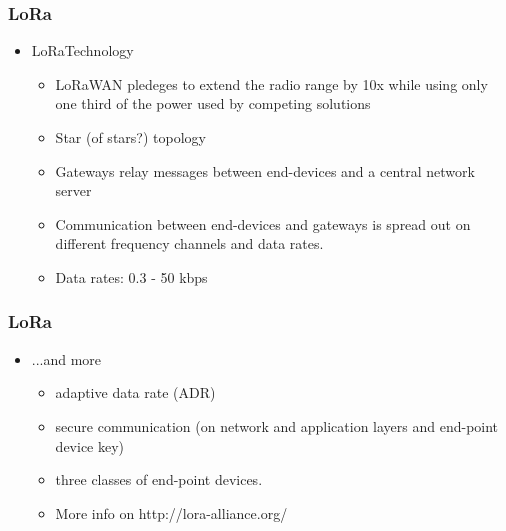 \begin{frame}[fragile]
  \frametitle{LoRa\texttrademark}
  \begin{itemize}
    \item LoRa\texttrademark Technology
    \begin{itemize}
      \item LoRaWAN pledeges to extend the radio range by 10x while using only one third of the power used by competing solutions 
      \item Star (of stars?) topology
      \item Gateways relay messages between end-devices and a central network server
      \item Communication between end-devices and gateways is spread out on different frequency channels and data rates.
      \item Data rates: 0.3 - 50 kbps
    \end{itemize}
  \end{itemize}
\end{frame}

\begin{frame}[fragile]
  \frametitle{LoRa\texttrademark}
  \begin{itemize}
    \item ...and more
    \begin{itemize}
      \item adaptive data rate (ADR)
      \item secure communication (on network and application layers and end-point device key)
      \item three classes of end-point devices.
      \item More info on http://lora-alliance.org/
    \end{itemize}
  \end{itemize}
\end{frame}

